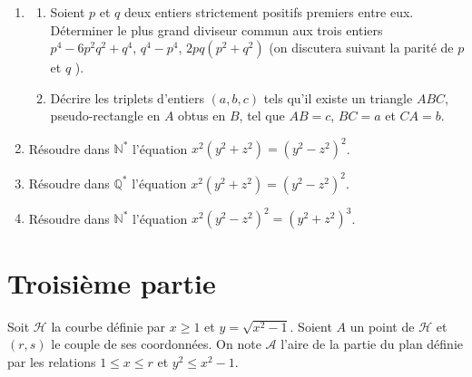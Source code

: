 \documentclass[landscape,twocolumn,leqno,a4paper,10pt]{report} %
\newcommand\n{\noindent}
\renewcommand{\geq}{\geqslant}
\renewcommand{\leq}{\leqslant}
\begin{document}
\begin{enumerate}
	\item \begin{enumerate}
		\item Soient $p$ et $q$ deux entiers strictement positifs premiers entre eux. Déterminer le plus grand diviseur commun aux trois entiers $p^{4}-6 p^{2} q^{2}+q^{4}$, $q^{4}-p^{4}$, $2 p q\left(p^{2}+q^{2}\right)$ (on discutera suivant la parité de $p$ et $q$ ).
		\item Décrire les triplets d'entiers $(a, b, c)$ tels qu'il existe un triangle $A B C$, pseudo-rectangle en $A$ obtus en $B$, tel que $A B=c$, $B C=a$ et $C A=b$.
	\end{enumerate}
	\item Résoudre dans $\mathbb{N}^{*}$ l'équation $x^{2}\left(y^{2}+z^{2}\right)=\left(y^{2}-z^{2}\right)^{2}$.
	\item Résoudre dans $\mathbb{Q}^{*}$ l'équation $x^{2}\left(y^{2}+z^{2}\right)=\left(y^{2}-z^{2}\right)^{2}$.
	\item Résoudre dans $\mathbb{N}^{*}$ l'équation $x^{2}\left(y^{2}-z^{2}\right)^{2}=\left(y^{2}+z^{2}\right)^{3}$.
\end{enumerate}

\newpage

\section{Troisième partie}

\n Soit $\mathcal{H}$ la courbe définie par $x \geq 1$ et $y=\sqrt{x^{2}-1}$. Soient $A$ un point de $\mathcal{H}$ et $(r, s)$ le couple de ses coordonnées. On note $\mathcal{A}$ l'aire de la partie du plan définie par les relations $1 \leq x \leq r$ et $y^{2} \leq x^{2}-1$.
\end{document}
